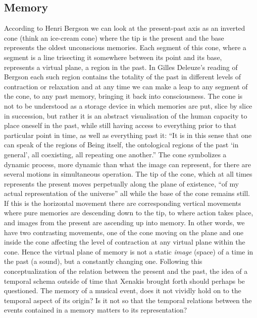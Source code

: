 \subsection{Memory}
\label{sec:memory}


According to Henri Bergson we can look at the present-past axis as an inverted cone (think an ice-cream cone) where the tip is the present and the base represents the oldest unconscious memories. Each segment of this cone, where a segment is a line trisecting it somewhere between its point and its base, represents a virtual plane, a region in the past. \parencite[][Ch.3]{bergson91} 
In Gilles Deleuze's reading of Bergson each such region contains the totality of the past in different levels of contraction or relaxation and at any time we can make a leap to any segment of the cone, to any past memory, bringing it back into consciousness. \parencite[][60]{deleuze88} The cone is not to be understood as a storage device in which memories are put, slice by slice in succession, but rather it is an abstract visualisation of the human capacity to place oneself in the past, while still having access to everything prior to that particular point in time, as well as everything past it: ``It is in this sense that one can speak of the regions of Being itself, the ontological regions of the past `in general', all coexisting, all repeating one another.'' \parencite[61]{deleuze88}
The cone symbolizes a dynamic process, more dynamic than what the image can represent, for there are several motions in simultaneous operation. The tip of the cone, which at all times represents the present moves perpetually along the plane of existence, ``of my actual representation of the universe'' all while the base of the cone remains still. If this is the horizontal movement there are corresponding vertical movements where pure memories are descending down to the tip, to where action takes place, and images from the present are ascending up into memory. \parencite[See also][47-8]{lawlor03} In other words, we have two contrasting movements, one of the cone moving on the plane and one inside the cone affecting the level of contraction at any virtual plane within the cone. Hence the virtual plane of memory is not a static \emph{image} (space) of a time in the past (a sound), but a constantly changing one. Following this conceptualization of the relation between the present and the past, the idea of a temporal schema outside of time that Xenakis brought forth should perhaps be questioned. The memory of a musical event, does it not vividly hold on to the temporal aspect of its origin? Is it not so that the temporal relations between the events contained in a memory matters to its representation?

